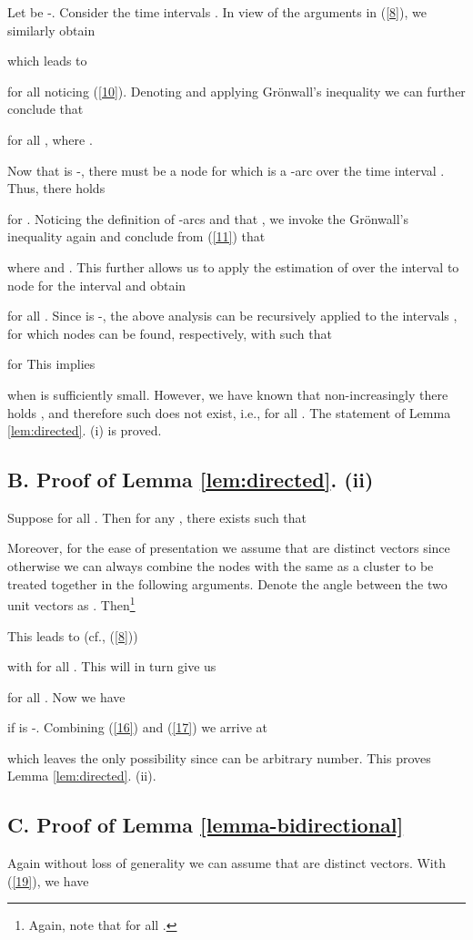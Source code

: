 \documentclass[a4paper, 11pt]{article}
\begin{document}
\noindent  Let   be -. Consider the  time intervals . In view of the arguments in (\ref{8}), we similarly obtain

which leads to

for all  noticing (\ref{10}). Denoting  and applying  Gr\"{o}nwall's inequality we can further conclude that

for all , where .

Now that    is -, there must be a node  for which  is a -arc over the time  interval . Thus, there holds

for . Noticing the definition of -arcs and that , we invoke the Gr\"{o}nwall's inequality again and conclude from (\ref{11}) that

 where  and . This further allows us to apply the estimation of  over the interval  to node  for the interval  and obtain
 
for all .
Since   is -, the above analysis can be recursively applied to the intervals , for which nodes  can be found, respectively, with  such that
 
for 
This implies
 
when  is sufficiently small. However, we have known that non-increasingly there holds , and therefore such  does not exist, i.e.,   for all . The statement of Lemma \ref{lem:directed}. (i) is proved.

\subsection*{B. Proof of Lemma \ref{lem:directed}. (ii)}

Suppose  for all . Then for any , there exists  such that

Moreover, for the ease of presentation  we assume that  are distinct vectors since otherwise we can always combine the nodes with the same  as a cluster to be treated together in the following arguments.
Denote the angle between the two unit vectors  as . Then\footnote{Again, note that  for all .}

This leads to (cf., (\ref{8}))

with 
for all .
This will in turn give us

for all . Now we have

if   is -. Combining (\ref{16}) and (\ref{17}) we arrive at

which leaves  the only possibility since  can be arbitrary number. This proves Lemma \ref{lem:directed}. (ii).

\subsection*{C. Proof of Lemma \ref{lemma-bidirectional}}
 Again without loss of generality we can assume that   are distinct vectors. With (\ref{19}), we have
\end{document}
